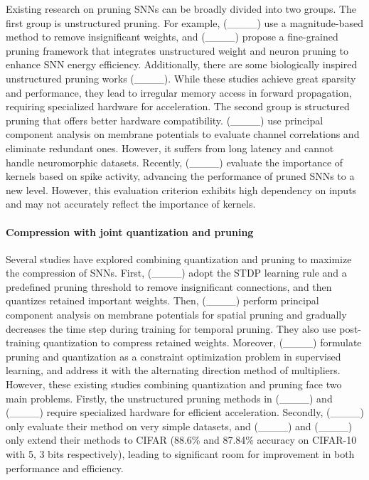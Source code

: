 Existing research on pruning SNNs can be broadly divided into two groups.
The first group is unstructured pruning.
For example, (____) use a magnitude-based method to remove insignificant weights, and (____) propose a fine-grained pruning framework that integrates unstructured weight and neuron pruning to enhance SNN energy efficiency.
Additionally, there are some biologically inspired unstructured pruning works (____).
While these studies achieve great sparsity and performance, they lead to irregular memory access in forward propagation, requiring specialized hardware for acceleration.
The second group is structured pruning that offers better hardware compatibility.
(____) use principal component analysis on membrane potentials to evaluate channel correlations and eliminate redundant ones.
However, it suffers from long latency and cannot handle neuromorphic datasets.
Recently, (____) evaluate the importance of kernels based on spike activity, advancing the performance of pruned SNNs to a new level.
However, this evaluation criterion exhibits high dependency on inputs and may not accurately reflect the importance of kernels.


\paragraph{Compression with joint quantization and pruning}
Several studies have explored combining quantization and pruning to maximize the compression of SNNs.
First, (____) adopt the STDP learning rule and a predefined pruning threshold to remove insignificant connections, and then quantizes retained important weights.
Then, (____) perform principal component analysis on membrane potentials for spatial pruning and gradually decreases the time step during training for temporal pruning. They also use post-training quantization to compress retained weights.
Moreover, (____) formulate pruning and quantization as a constraint optimization problem in supervised learning, and address it with the alternating direction method of multipliers.
However, these existing studies combining quantization and pruning face two main problems.
Firstly, the unstructured pruning methods in (____) and (____) require specialized hardware for efficient acceleration.
Secondly, (____) only evaluate their method on very simple datasets, and (____) and (____) only extend their methods to CIFAR (88.6\% and 87.84\% accuracy on CIFAR-10 with 5, 3 bits respectively), leading to significant room for improvement in both performance and efficiency.
